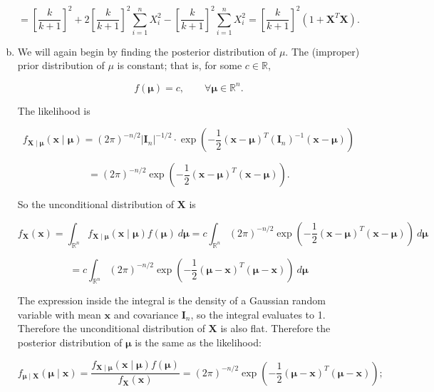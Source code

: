 \begin{solution}
\begin{enumerate}[(a)]
\[
= \left[ \frac{k}{k+1} \right]^2   + 2 \left[ \frac{k}{k+1}\right]^2    \sum_{i=1}^n  X_i ^2  - \left[ \frac{k}{k+1} \right]^2 \sum_{i=1}^n X_i^2 = \left[ \frac{k}{k+1} \right]^2 \left(1   +     \boldsymbol{X}^T \boldsymbol{X} \right).  
\] 


\item We will again begin by finding the posterior distribution of \(\mu\). The (improper) prior distribution of \(\mu\) is constant; that is, for some \(c\in \mathbb{R}\),

\[
f(\boldsymbol{\mu}) = c, \qquad \forall \boldsymbol{\mu} \in \mathbb{R}^n.
\]

The likelihood is

\[
f_{\boldsymbol{X} \mid \boldsymbol{\mu}}(\boldsymbol{x} \mid \boldsymbol{\mu}) = (2 \pi)^{-n/2} | \boldsymbol{I}_n|^{-1/2} \cdot \exp \left(- \frac{1}{2}(\boldsymbol{x} - \boldsymbol{\mu}) ^T ( \boldsymbol{I}_n)^{-1} (\boldsymbol{x} - \boldsymbol{\mu} ) \right)
\]

\[
= (2 \pi)^{-n/2} \exp \left(- \frac{1}{2}(\boldsymbol{x} - \boldsymbol{\mu}) ^T  (\boldsymbol{x} - \boldsymbol{\mu} ) \right).
\]

So the unconditional distribution of \(\boldsymbol{X}\) is

\[
f_{\boldsymbol{X}}(\boldsymbol{x})  = \int_{\mathbb{R}^n} f_{\boldsymbol{X} \mid \boldsymbol{\mu}}(\boldsymbol{x} \mid \boldsymbol{\mu}) f(\boldsymbol{\mu}) \ d \boldsymbol{\mu} = c \int_{\mathbb{R}^n}  (2 \pi)^{-n/2} \exp \left(- \frac{1}{2}(\boldsymbol{x} - \boldsymbol{\mu}) ^T  (\boldsymbol{x} - \boldsymbol{\mu} ) \right)  \ d \boldsymbol{\mu}
\]

\[
= c \int_{\mathbb{R}^n}  (2 \pi)^{-n/2} \exp \left(- \frac{1}{2}(  \boldsymbol{\mu} - \boldsymbol{x}) ^T  (\boldsymbol{\mu} - \boldsymbol{x}) \right)  \ d \boldsymbol{\mu}
\]

The expression inside the integral is the density of a Gaussian random variable with mean \(\boldsymbol{x}\) and covariance \(\boldsymbol{I}_n\), so the integral evaluates to 1. Therefore the unconditional distribution of \(\boldsymbol{X}\) is also flat. Therefore the posterior distribution of \(\boldsymbol{\mu}\) is the same as the likelihood:

\[
f_{\boldsymbol{\mu} \mid \boldsymbol{X}}(\boldsymbol{\mu} \mid \boldsymbol{x}) = \frac{f_{\boldsymbol{X} \mid \boldsymbol{\mu}}(\boldsymbol{x} \mid \boldsymbol{\mu}) f(\boldsymbol{\mu})}{f_{\boldsymbol{X}}(\boldsymbol{x})} = (2 \pi)^{-n/2} \exp \left(- \frac{1}{2}(\boldsymbol{\mu} - \boldsymbol{x} ) ^T  ( \boldsymbol{\mu} - \boldsymbol{x}) \right);
\]


\end{enumerate}
\end{solution}
